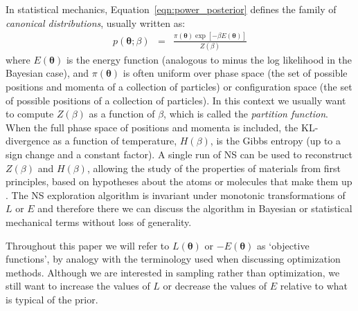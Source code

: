 \documentclass[entropy,article,submit,moreauthors,pdftex,10pt,a4paper]{Definitions/mdpi}
\newcommand{\xx}{\boldsymbol{\theta}}
\begin{document}
In statistical mechanics, Equation~\ref{eqn:power_posterior} defines the
family of {\it canonical distributions}, usually written as:
\begin{eqnarray}
p(\xx; \beta) &=& \frac{\pi(\xx)\exp[-\beta E(\xx)]}{Z(\beta)}
\end{eqnarray}
where $E(\xx)$ is the energy function (analogous to minus the log likelihood
in the Bayesian case), and $\pi(\xx)$ is often uniform over
phase space (the set of possible positions and momenta of a collection of
particles) or configuration space (the set of possible positions of a collection
of particles). In this context we usually want to
compute $Z(\beta)$ as a function of $\beta$, which is called the
{\it partition function}. When the full phase space of positions and momenta
is included, the KL-divergence as a function of temperature,
$H(\beta)$, is the Gibbs entropy (up to a sign change and a constant factor).
A single run of NS can be used to reconstruct $Z(\beta)$ and $H(\beta)$,
allowing the study of
the properties of materials from first principles, based on hypotheses about
the atoms or molecules that make them up
\citep[e.g.][]{partay2010efficient, baldock2016determining}.
The NS exploration algorithm is invariant under
monotonic transformations of $L$ or $E$ and therefore there we can discuss the
algorithm in Bayesian or statistical mechanical terms without loss of
generality.

Throughout this paper we will refer to $L(\xx)$ or
$-E(\xx)$ as `objective functions',
by analogy with the terminology used when
discussing optimization methods. Although we are interested in sampling rather
than optimization, we still want to increase the values of $L$ or decrease
the values of $E$ relative to what is typical of the prior.
\end{document}

